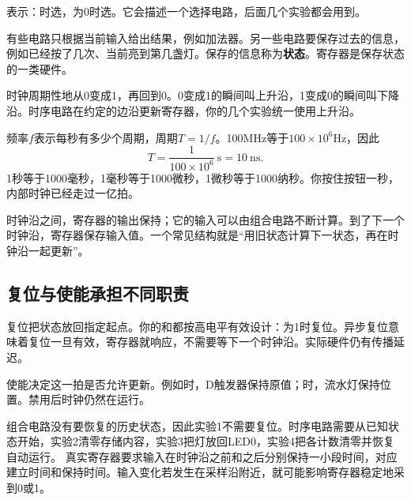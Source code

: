 表示：时选，为0时选。它会描述一个选择电路，后面几个实验都会用到。

有些电路只根据当前输入给出结果，例如加法器。另一些电路要保存过去的信息，例如已经按了几次、当前亮到第几盏灯。保存的信息称为\textbf{状态}。寄存器是保存状态的一类硬件。

时钟周期性地从0变成1，再回到0。0变成1的瞬间叫上升沿，1变成0的瞬间叫下降沿。时序电路在约定的边沿更新寄存器，你的几个实验统一使用上升沿。

\begin{center}
\end{center}

频率$f$表示每秒有多少个周期，周期$T=1/f$。100MHz等于$100\times10^6$Hz，因此
\[
T=\frac{1}{100\times10^6}\ \mathrm{s}=10\ \mathrm{ns}.
\]
1秒等于1000毫秒，1毫秒等于1000微秒，1微秒等于1000纳秒。你按住按钮一秒，内部时钟已经走过一亿拍。

时钟沿之间，寄存器的输出保持；它的输入可以由组合电路不断计算。到了下一个时钟沿，寄存器保存输入值。一个常见结构就是“用旧状态计算下一状态，再在时钟沿一起更新”。

\subsection{复位与使能承担不同职责}
复位把状态放回指定起点。你的和都按高电平有效设计：为1时复位。异步复位意味着复位一旦有效，寄存器就响应，不需要等下一个时钟沿。实际硬件仍有传播延迟。

使能决定这一拍是否允许更新。例如时，D触发器保持原值；时，流水灯保持位置。禁用后时钟仍然在运行。

组合电路没有要恢复的历史状态，因此实验1不需要复位。时序电路需要从已知状态开始，实验2清零存储内容，实验3把灯放回LED0，实验4把各计数清零并恢复自动运行。
真实寄存器要求输入在时钟沿之前和之后分别保持一小段时间，对应建立时间和保持时间。输入变化若发生在采样沿附近，就可能影响寄存器稳定地采到0或1。
